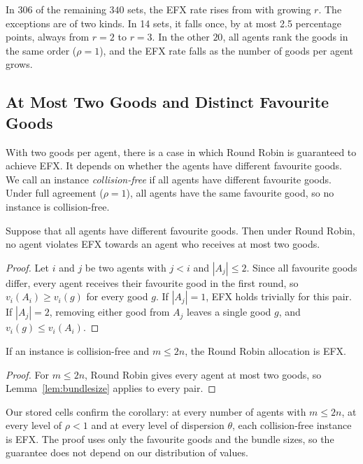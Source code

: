 In $306$ of the remaining $340$ sets, the EFX rate rises from with growing $r$. The
exceptions are of two kinds. In 14 sets, it falls once, by at most 2.5 percentage points, always from $r = 2$ to $r= 3$. In the other $20$, all agents rank
the goods in the same order ($\rho=1$), and the EFX rate falls as the number of goods per agent
grows.

\subsection{At Most Two Goods and Distinct Favourite Goods}\label{sec:bundlesize}

With two goods per agent, there is a case in which Round Robin is guaranteed to achieve EFX. It
depends on whether the agents have different favourite goods. We call an instance
\textit{collision-free} if all agents have different favourite goods. Under full agreement
($\rho=1$), all agents have the same favourite good, so no instance is collision-free.

\begin{lemma}\label{lem:bundlesize}
Suppose that all agents have different favourite goods. Then under Round Robin, no agent violates
EFX towards an agent who receives at most two goods.
\end{lemma}

\begin{proof}
Let $i$ and $j$ be two agents with $j<i$ and $|A_j|\leq2$. Since all favourite goods differ, every agent
receives their favourite good in the first round, so $v_i(A_i)\geq v_i(g)$ for every good $g$. If
$|A_j|=1$, EFX holds trivially for this pair. If $|A_j|=2$, removing either good from $A_j$ leaves
a single good $g$, and $v_i(g)\leq v_i(A_i)$.
\end{proof}

\begin{corollary}\label{cor:bundlesize}
If an instance is collision-free and $m\leq2n$, the Round Robin allocation is EFX.
\end{corollary}

\begin{proof}
For $m\leq2n$, Round Robin gives every agent at most two goods, so Lemma~\ref{lem:bundlesize}
applies to every pair.
\end{proof}

Our stored cells confirm the corollary: at every number of agents with $m\leq2n$, at every level
of $\rho <1$ and at every level of dispersion $\theta$, each collision-free instance is EFX. The
proof uses only the favourite goods and the bundle sizes, so the guarantee does not depend on our
distribution of values.

